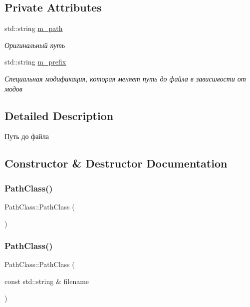 \subsection*{Private Attributes}
\begin{DoxyCompactItemize}
\item 
std\+::string \hyperlink{class_path_class_a538100c80041baadecabc35738609eaf}{m\+\_\+path}
\begin{DoxyCompactList}\small\item\em Оригинальный путь \end{DoxyCompactList}\item 
std\+::string \hyperlink{class_path_class_ab43e04cf7461f1d27d27d5733d42351f}{m\+\_\+prefix}
\begin{DoxyCompactList}\small\item\em Специальная модификация, которая меняет путь до файла в зависимости от модов \end{DoxyCompactList}\end{DoxyCompactItemize}


\subsection{Detailed Description}
Путь до файла 

\subsection{Constructor \& Destructor Documentation}
\mbox{\label{class_path_class_a13b1f0b300889f096151e0fc2a6890a6}} 
\subsubsection{\texorpdfstring{Path\+Class()}{PathClass()}\hspace{0.1cm}{\footnotesize\ttfamily [1/4]}}
{\footnotesize\ttfamily Path\+Class\+::\+Path\+Class (\begin{DoxyParamCaption}{ }\end{DoxyParamCaption})}

\mbox{\label{class_path_class_ac14304bfe63bb472ea21311226e706c0}} 
\subsubsection{\texorpdfstring{Path\+Class()}{PathClass()}\hspace{0.1cm}{\footnotesize\ttfamily [2/4]}}
{\footnotesize\ttfamily Path\+Class\+::\+Path\+Class (\begin{DoxyParamCaption}\item[{const std\+::string \&}]{filename }\end{DoxyParamCaption})}



